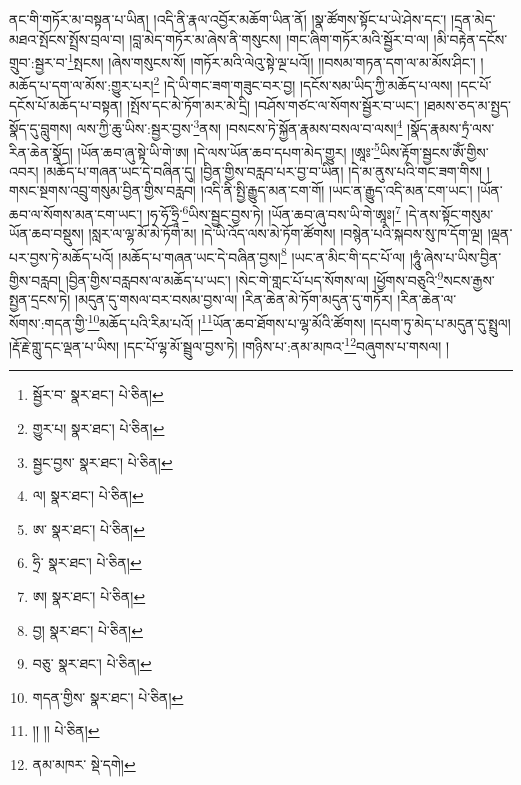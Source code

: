 ནང་གི་གཏོར་མ་བསྟན་པ་ཡིན། །འདི་ནི་རྣལ་འབྱོར་མཆོག་ཡིན་ནོ། །སྣ་ཚོགས་སྟོང་པ་ཡེ་ཤེས་དང་། །དྲན་མེད་མཐའ་སྤོངས་སྤྲོས་བྲལ་བ། །བླ་མེད་གཏོར་མ་ཞེས་ནི་གསུངས། །གང་ཞིག་གཏོར་མའི་སྦྱོར་བ་ལ། །མི་བརྟེན་དངོས་གྲུབ་:སྦྱར་བ་\footnote{སྦྱོར་བ་  སྣར་ཐང་།  པེ་ཅིན། }སྤངས། །ཞེས་གསུངས་སོ། །གཏོར་མའི་ལེའུ་སྟེ་ལྔ་པའོ།། །།བསམ་གཏན་དག་ལ་མ་མོས་ཤིང་། །མཆོད་པ་དག་ལ་མོས་:གྱུར་པར།\footnote{གྱུར་པ།  སྣར་ཐང་།  པེ་ཅིན། } །དེ་ཡི་གང་ཟག་གཟུང་བར་བྱ། །དངོས་སམ་ཡིད་ཀྱི་མཆོད་པ་ལས། །དང་པོ་དངོས་པོ་མཆོད་པ་བསྟན། །སྤོས་དང་མེ་ཏོག་མར་མེ་དྲི། །བཤོས་གཙང་ལ་སོགས་སྦྱོར་བ་ཡང་། །ཐམས་ཅད་མ་སྤྱད་སྣོད་དུ་བླུགས། ལས་ཀྱི་ཆུ་ཡིས་:སྦྱར་བྱས་\footnote{སྦྱང་བྱས་  སྣར་ཐང་།  པེ་ཅིན། }ནས། །བསངས་ཏེ་སྐྱོན་རྣམས་བསལ་བ་ལས།\footnote{ལ།  སྣར་ཐང་།  པེ་ཅིན། } །སྣོད་རྣམས་ཏྲཾ་ལས་རིན་ཆེན་སྣོད། །ཡོན་ཆབ་ཞུ་སྟེ་ཡི་གེ་ཨ། །དེ་ལས་ཡོན་ཆབ་དཔག་མེད་གྱུར། །ཨཱཿ་\footnote{ཨ་  སྣར་ཐང་།  པེ་ཅིན། }ཡིས་རྟོག་སྦྱངས་ཨོཾ་གྱིས་འབར། །མཆོད་པ་གཞན་ཡང་དེ་བཞིན་དུ། །བྱིན་གྱིས་བརླབ་པར་བྱ་བ་ཡིན། །དེ་མ་ནུས་པའི་གང་ཟག་གིས། །གསང་སྔགས་འབྲུ་གསུམ་བྱིན་གྱིས་བརླབ། །འདི་ནི་སྤྱི་རྒྱུད་མན་ངག་གོ། །ཡང་ན་རྒྱུད་འདི་མན་ངག་ཡང་། །ཡོན་ཆབ་ལ་སོགས་མན་ངག་ཡང་། །ཧ་ཧོ་ཧྲཱི་\footnote{ཧྲི་  སྣར་ཐང་།  པེ་ཅིན། }ཡིས་སྦྱང་བྱས་ཏེ། །ཡོན་ཆབ་ཞུ་བས་ཡི་གེ་ཨཱཿ།\footnote{ཨ།  སྣར་ཐང་།  པེ་ཅིན། } །དེ་ནས་སྟོང་གསུམ་ཡོན་ཆབ་བསྡུས། །སླར་ལ་ལྷ་མོ་མེ་ཏོག་མ། །དེ་ཡི་འོད་ལས་མེ་ཏོག་ཚོགས། །བསྙེན་པའི་སྐབས་སུ་ཁ་དོག་ལྔ། །ལྡན་པར་བྱས་ཏེ་མཆོད་པའོ། །མཆོད་པ་གཞན་ཡང་དེ་བཞིན་བྱས།\footnote{བྱ།  སྣར་ཐང་།  པེ་ཅིན། } །ཡང་ན་མིང་གི་དང་པོ་ལ། །ཧཱུཾ་ཞེས་པ་ཡིས་བྱིན་གྱིས་བརླབ། །བྱིན་གྱིས་བརླབས་ལ་མཆོད་པ་ཡང་། །སེང་གེ་གླང་པོ་པད་སོགས་ལ། །ཕྱོགས་བཅུའི་\footnote{བཅུ་  སྣར་ཐང་།  པེ་ཅིན། }སངས་རྒྱས་སྤྱན་དྲངས་ཏེ། །མདུན་དུ་གསལ་བར་བསམ་བྱས་ལ། །རིན་ཆེན་མེ་ཏོག་མདུན་དུ་གཏོར། །རིན་ཆེན་ལ་སོགས་:གདན་གྱི་\footnote{གདན་གྱིས་  སྣར་ཐང་།  པེ་ཅིན། }མཆོད་པའི་རིམ་པའོ། །\footnote{།། །།  པེ་ཅིན། }ཡོན་ཆབ་ཐོགས་པ་ལྷ་མོའི་ཚོགས། །དཔག་ཏུ་མེད་པ་མདུན་དུ་སྤྲུལ། །རྡོ་རྗེ་གླུ་དང་ལྡན་པ་ཡིས། །དང་པོ་ལྷ་མོ་སྦྲུལ་བྱས་ཏེ། །གཉིས་པ་:ནམ་མཁའ་\footnote{ནམ་མཁར་  སྡེ་དགེ། }བཞུགས་པ་གསལ། །
